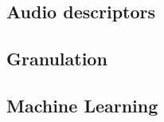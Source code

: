 \subsection{Audio descriptors}
\subsection{Granulation}
\subsection{Machine Learning}

\iffalse
It seems like a description of this section is also in the introduction
description. Which means that it could probably be fitted in there, instead of
making a whole another section for it in the paper.
\fi